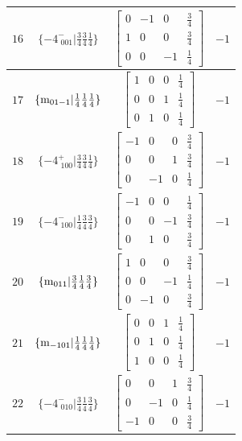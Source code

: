 \documentclass[fleqn,8pt]{jsarticle}
\begin{document}
\begin{longtable}{cccc}
$ 16 $ & $ \{-4^{-}_{\,\,001}|\frac{3}{4} \frac{3}{4} \frac{1}{4}\} $ & $ \begin{bmatrix} 0 & -1 & 0 & \frac{3}{4} \\ 1 & 0 & 0 & \frac{3}{4} \\ 0 & 0 & -1 & \frac{1}{4} \end{bmatrix} $ & $ -1 $ \\ \hline
$ 17 $ & $ \{{\rm m}_{01-1}|\frac{1}{4} \frac{1}{4} \frac{1}{4}\} $ & $ \begin{bmatrix} 1 & 0 & 0 & \frac{1}{4} \\ 0 & 0 & 1 & \frac{1}{4} \\ 0 & 1 & 0 & \frac{1}{4} \end{bmatrix} $ & $ -1 $ \\ \hline
$ 18 $ & $ \{-4^{+}_{\,\,100}|\frac{3}{4} \frac{3}{4} \frac{1}{4}\} $ & $ \begin{bmatrix} -1 & 0 & 0 & \frac{3}{4} \\ 0 & 0 & 1 & \frac{3}{4} \\ 0 & -1 & 0 & \frac{1}{4} \end{bmatrix} $ & $ -1 $ \\ \hline
$ 19 $ & $ \{-4^{-}_{\,\,100}|\frac{1}{4} \frac{3}{4} \frac{3}{4}\} $ & $ \begin{bmatrix} -1 & 0 & 0 & \frac{1}{4} \\ 0 & 0 & -1 & \frac{3}{4} \\ 0 & 1 & 0 & \frac{3}{4} \end{bmatrix} $ & $ -1 $ \\ \hline
$ 20 $ & $ \{{\rm m}_{011}|\frac{3}{4} \frac{1}{4} \frac{3}{4}\} $ & $ \begin{bmatrix} 1 & 0 & 0 & \frac{3}{4} \\ 0 & 0 & -1 & \frac{1}{4} \\ 0 & -1 & 0 & \frac{3}{4} \end{bmatrix} $ & $ -1 $ \\ \hline
$ 21 $ & $ \{{\rm m}_{-101}|\frac{1}{4} \frac{1}{4} \frac{1}{4}\} $ & $ \begin{bmatrix} 0 & 0 & 1 & \frac{1}{4} \\ 0 & 1 & 0 & \frac{1}{4} \\ 1 & 0 & 0 & \frac{1}{4} \end{bmatrix} $ & $ -1 $ \\ \hline
$ 22 $ & $ \{-4^{-}_{\,\,010}|\frac{3}{4} \frac{1}{4} \frac{3}{4}\} $ & $ \begin{bmatrix} 0 & 0 & 1 & \frac{3}{4} \\ 0 & -1 & 0 & \frac{1}{4} \\ -1 & 0 & 0 & \frac{3}{4} \end{bmatrix} $ & $ -1 $ \\ \hline

\end{longtable}
\end{document}
